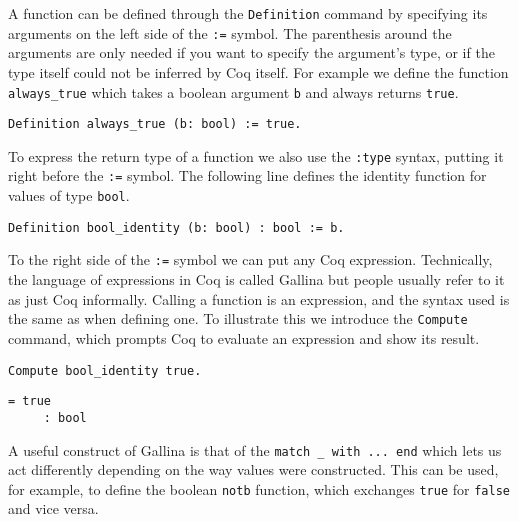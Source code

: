 A function can be defined through the \texttt{Definition} command by specifying its arguments on
the left side of the \texttt{:=} symbol. The parenthesis around the arguments are only needed if you 
want to specify the argument's type, or if the type itself could not be inferred by Coq itself. For 
example we define the function \texttt{always_true} which takes a boolean argument 
\texttt{b} and always returns \texttt{true}.

\begin{verbatim}
Definition always_true (b: bool) := true.
\end{verbatim}

To express the return type of a function we also use the \texttt{:type} syntax, putting it 
right before the \texttt{:=} symbol. The following line defines the identity function for
values of type \texttt{bool}.

\begin{verbatim}
Definition bool_identity (b: bool) : bool := b.
\end{verbatim}

To the right side of the \texttt{:=} symbol we can put any Coq expression. Technically, the 
language of expressions in Coq is called Gallina
but people usually refer to it as just Coq informally. Calling a function is an expression, and the syntax
used is the same as when defining one. To illustrate this we introduce the \texttt{Compute}
command, which prompts Coq to evaluate an expression and show its result. 

\begin{verbatim}
Compute bool_identity true.
\end{verbatim}
\vspace{-\baselineskip*2/2}
\begin{verbatim}
= true
     : bool
\end{verbatim}

A useful construct of Gallina is that of the 
\texttt{match _ with ... end} which lets us act differently depending on the way values were
constructed. This can be used, for example, to define the boolean \texttt{notb} function,
which exchanges \texttt{true} for \texttt{false} and vice versa.

